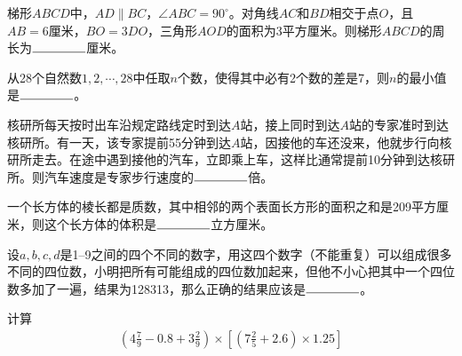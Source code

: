 \begin{question}
  梯形$ABCD$中，$AD\parallel BC$，$\angle ABC=90^\circ$。对角线$AC$和$BD$相交于点$O$，且$AB=6$厘米，$BO=3DO$，三角形$AOD$的面积为3平方厘米。则梯形$ABCD$的周长为$\blankline$厘米。

  \begin{center}
  \end{center}
\end{question}


\begin{question}
  从28个自然数$1,2,\cdots,28$中任取$n$个数，使得其中必有2个数的差是7，则$n$的最小值是$\blankline$。
\end{question}



\begin{question}
  核研所每天按时出车沿规定路线定时到达$A$站，接上同时到达$A$站的专家准时到达核研所。有一天，该专家提前55分钟到达$A$站，因接他的车还没来，他就步行向核研所走去。在途中遇到接他的汽车，立即乘上车，这样比通常提前10分钟到达核研所。则汽车速度是专家步行速度的$\blankline$倍。
\end{question}


\begin{question}
  一个长方体的棱长都是质数，其中相邻的两个表面长方形的面积之和是209平方厘米，则这个长方体的体积是$\blankline$立方厘米。
\end{question}


\begin{question}
  设$a,b,c,d$是1--9之间的四个不同的数字，用这四个数字（不能重复）可以组成很多不同的四位数，小明把所有可能组成的四位数加起来，但他不小心把其中一个四位数多加了一遍，结果为128313，那么正确的结果应该是$\blankline$。
\end{question}


\begin{question}
  计算
  \begin{align*}
    \left( 4\frac79 - 0.8 + 3\frac29 \right) \times
    \left[ \left( 7\frac25 + 2.6 \right) \times 1.25 \right]
  \end{align*}
\end{question}


